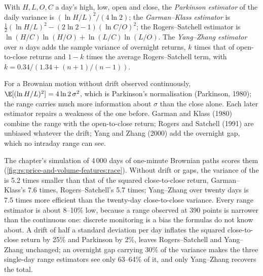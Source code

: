 \begin{definition}\label{def:rs:price-and-volume-features:estimators}
With $H, L, O, C$ a day's high, low, open and close, the \emph{Parkinson estimator} of the daily variance is
$(\ln H/L)^2/(4\ln 2)$; the \emph{Garman--Klass estimator} is $\tfrac12(\ln H/L)^2 - (2\ln 2 -
1)(\ln C/O)^2$; the Rogers--Satchell estimator is $\ln(H/C)\ln(H/O) + \ln(L/C)\ln(L/O)$. The \emph{Yang--Zhang
estimator} over $n$ days adds the sample variance of overnight returns, $k$ times that of open-to-close
returns and $1 - k$ times the average Rogers--Satchell term, with $k = 0.34/(1.34 + (n+1)/(n-1))$.
\end{definition}

For a Brownian motion without drift observed continuously, $\E[(\ln H/L)^2] = 4\ln2\,\sigma^2$, which is Parkinson's normalisation
(Parkinson, 1980); the range carries much more information about $\sigma$ than the close alone. Each later estimator repairs a
weakness of the one before. Garman and Klass (1980) combine the range with the open-to-close return; Rogers and Satchell (1991) are
unbiased whatever the drift; Yang and Zhang (2000) add the overnight gap, which no intraday range can see.

The chapter's simulation of 4\,000 days of one-minute Brownian paths scores them (\cref{fig:rs:price-and-volume-features:race}).
Without drift or gaps, the variance of the  is 5.2 times smaller than that of the squared close-to-close return,
Garman--Klass's 7.6 times, Rogers--Satchell's 5.7 times; Yang--Zhang over twenty days is 7.5 times more efficient than the
twenty-day close-to-close variance. Every range estimator is about 8--10\% low, because a range observed at 390 points is narrower
than the continuous one: discrete monitoring is a bias the formulas do not know about. A drift of half a standard deviation per day
inflates the squared close-to-close return by 25\% and Parkinson by 2\%, leaves Rogers--Satchell and Yang--Zhang unchanged; an overnight
gap carrying 30\% of the variance makes the three single-day range estimators see only 63--64\% of it, and only Yang--Zhang recovers
the total.

